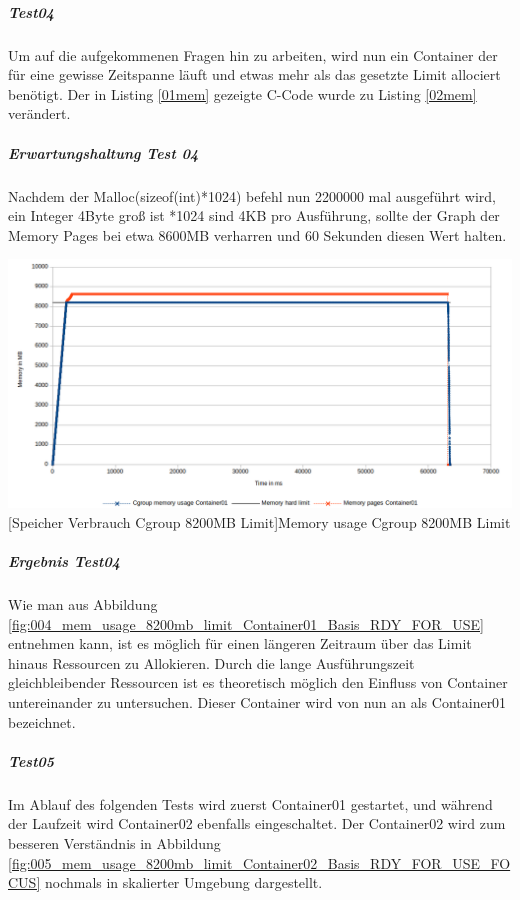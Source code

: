 \subparagraph{Test04}
Um auf die aufgekommenen Fragen hin zu arbeiten, wird nun ein Container der für eine gewisse Zeitspanne läuft und etwas mehr als das gesetzte Limit allociert benötigt. Der in Listing \ref{01mem} gezeigte C-Code wurde zu Listing \ref{02mem} verändert. 

\vspace{1em}


\subparagraph{Erwartungshaltung Test 04}
Nachdem der Malloc(sizeof(int)*1024) befehl nun 2200000 mal ausgeführt wird, ein Integer 4Byte groß ist *1024 sind 4KB pro Ausführung, sollte der Graph der Memory Pages bei etwa 8600MB verharren und 60 Sekunden diesen Wert halten.

\vspace{1em}
\begin{minipage}{\linewidth}
	\centering
	\includegraphics[width=1\linewidth]{pics/004_mem_usage_8200mb_limit_Container01_Basis_RDY_FOR_USE.png}
	[Speicher Verbrauch Cgroup 8200MB Limit]{Memory usage Cgroup 8200MB Limit}
	\label{fig:004_mem_usage_8200mb_limit_Container01_Basis_RDY_FOR_USE}
\end{minipage}

\subparagraph{Ergebnis Test04}
Wie man aus Abbildung \ref{fig:004_mem_usage_8200mb_limit_Container01_Basis_RDY_FOR_USE} entnehmen kann, ist es möglich für einen längeren Zeitraum über das Limit hinaus Ressourcen zu Allokieren. Durch die lange Ausführungszeit gleichbleibender Ressourcen ist es theoretisch möglich den Einfluss von Container untereinander zu untersuchen. Dieser Container wird von nun an als Container01 bezeichnet.

\subparagraph{Test05}
Im Ablauf des folgenden Tests wird zuerst Container01 gestartet, und während der Laufzeit wird Container02 ebenfalls eingeschaltet. Der Container02 wird zum besseren Verständnis in Abbildung \ref{fig:005_mem_usage_8200mb_limit_Container02_Basis_RDY_FOR_USE_FOCUS} nochmals in skalierter Umgebung dargestellt. 


